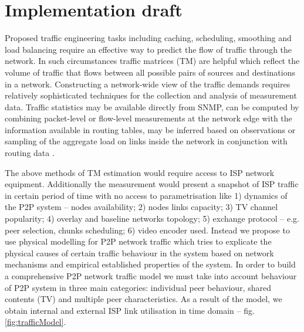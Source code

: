 \documentclass[10pt, conference, compsocconf]{IEEEtran}
\begin{document}
\section{Implementation draft}
Proposed traffic engineering tasks including caching, scheduling, smoothing and load balancing require an effective way to predict the flow of traffic through the network. In such circumstances traffic matrices (TM) are helpful which reflect the volume of traffic that flows between all possible pairs of sources and destinations in a network. Constructing a network-wide view of the traffic demands requires relatively sophisticated techniques for the collection and analysis of measurement data. Traffic statistics may be available directly from SNMP, can be computed by combining packet-level or flow-level measurements at the network edge with the information available in routing tables, may be inferred based on observations or sampling of the aggregate load on links inside the network in conjunction with routing data \cite{fortz_traffic_2002}⁠. 

The above methods of TM estimation would require access to ISP network equipment. Additionally the measurement would present a snapshot of ISP traffic in certain period of time with no access to parametrisation like 1) dynamics of the P2P system – nodes availability; 2) nodes links capacity; 3) TV channel popularity; 4) overlay and baseline networks topology; 5) exchange protocol – e.g. peer selection, chunks scheduling; 6) video encoder used. Instead we propose to use physical modelling for P2P network traffic which tries to explicate the physical causes of certain traffic behaviour in the system based on network mechanisms and empirical established properties of the system. In order to build a comprehensive P2P network traffic model we must take into account behaviour  of P2P system in three main categories: individual peer behaviour, shared contents (TV) and multiple peer characteristics. As a result of the model, we obtain internal and external ISP link utilisation in time domain -- fig. \ref{fig:trafficModel}.
\end{document}
